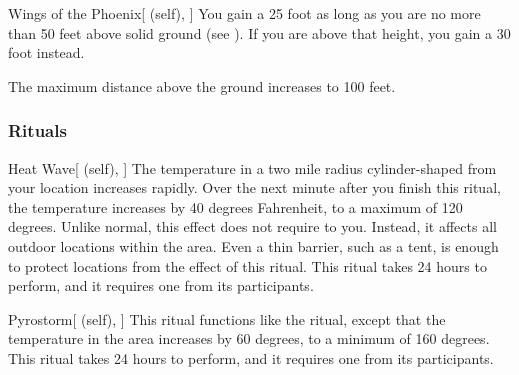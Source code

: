 \lowercase{\hypertarget{spell:Wings of the Phoenix}{}}\label{spell:Wings of the Phoenix}
\begin{attuneability}[Rank 5]{\hypertarget{spell:Wings of the Phoenix}{Wings of the Phoenix}}[ (self), ]
You gain a 25 foot  as long as you are no more than 50 feet above solid ground (see ).
If you are above that height, you gain a 30 foot  instead.

\rankline
{} The maximum distance above the ground increases to 100 feet.

\end{attuneability}
\vspace{0.25em}



\subsubsection{Rituals}


\lowercase{\hypertarget{spell:Heat Wave}{}}\label{spell:Heat Wave}
\begin{attuneability}[Rank 4]{\hypertarget{spell:Heat Wave}{Heat Wave}}[ (self), ]
\targetrule
The temperature in a two mile radius cylinder-shaped  from your location increases rapidly.
Over the next minute after you finish this ritual, the temperature increases by 40 degrees Fahrenheit, to a maximum of 120 degrees.
Unlike normal, this effect does not require  to you.
Instead, it affects all outdoor locations within the area.
Even a thin barrier, such as a tent, is enough to protect locations from the effect of this ritual.
This ritual takes 24 hours to perform, and it requires one  from its participants.
\end{attuneability}
\vspace{0.25em}



\lowercase{\hypertarget{spell:Pyrostorm}{}}\label{spell:Pyrostorm}
\begin{attuneability}[Rank 8]{\hypertarget{spell:Pyrostorm}{Pyrostorm}}[ (self), ]
\targetrule
This ritual functions like the  ritual, except that the temperature in the area increases by 60 degrees, to a minimum of 160 degrees.
This ritual takes 24 hours to perform, and it requires one  from its participants.
\end{attuneability}
\vspace{0.25em}



